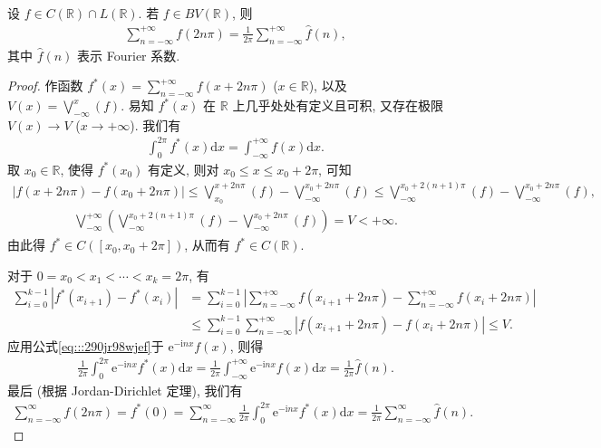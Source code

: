 \documentclass[../../main.tex]{subfiles}%
\begin{document}
\begin{proposition}[Poisson公式]
设 $f\in C(\mathbb{R})\cap L(\mathbb{R})$. 若 $f\in BV(\mathbb{R})$, 则
\begin{align*}
\sum_{n=-\infty}^{+\infty} f(2n\pi) = \frac{1}{2\pi}\sum_{n=-\infty}^{+\infty} \hat{f}(n),
\end{align*}
其中 $\hat{f}(n)$ 表示 Fourier 系数.
\end{proposition}
\begin{proof}

作函数 $f^*(x)=\sum_{n=-\infty}^{+\infty} f(x+2n\pi)$ ($x\in\mathbb{R}$), 以及 $V(x)=\bigvee_{-\infty}^x(f)$. 易知 $f^*(x)$ 在 $\mathbb{R}$ 上几乎处处有定义且可积, 又存在极限 $V(x)\to V$ ($x\to+\infty$). 我们有
\begin{align}\label{eq:::290jr98wjef}
\int_0^{2\pi} f^*(x)\mathrm{d}x = \int_{-\infty}^{+\infty} f(x)\mathrm{d}x.
\end{align}
取 $x_0\in\mathbb{R}$, 使得 $f^*(x_0)$ 有定义, 则对 $x_0\leqslant x\leqslant x_0+2\pi$, 可知
\begin{align*}
|f(x+2n\pi)-f(x_0+2n\pi)| \leqslant \bigvee_{x_0}^{x+2n\pi}(f) - \bigvee_{-\infty}^{x_0+2n\pi}(f) 
\leqslant \bigvee_{-\infty}^{x_0+2(n+1)\pi}(f) - \bigvee_{-\infty}^{x_0+2n\pi}(f), 
\end{align*}
\begin{align*}
\bigvee_{-\infty}^{+\infty}\left(\bigvee_{-\infty}^{x_0+2(n+1)\pi}(f) - \bigvee_{-\infty}^{x_0+2n\pi}(f)\right) = V < +\infty.
\end{align*}
由此得 $f^*\in C([x_0,x_0+2\pi])$, 从而有 $f^*\in C(\mathbb{R})$.

对于 $0=x_0<x_1<\cdots<x_k=2\pi$, 有
\begin{align*}
\sum_{i=0}^{k-1} |f^*(x_{i+1})-f^*(x_i)|
&= \sum_{i=0}^{k-1} \left|\sum_{n=-\infty}^{+\infty} f(x_{i+1}+2n\pi) - \sum_{n=-\infty}^{+\infty} f(x_i+2n\pi)\right| \\
&\leqslant \sum_{i=0}^{k-1} \sum_{n=-\infty}^{+\infty} |f(x_{i+1}+2n\pi)-f(x_i+2n\pi)| \leqslant V.
\end{align*}
应用公式\eqref{eq:::290jr98wjef}于 $\mathrm{e}^{-\mathrm{i}nx}f(x)$, 则得
\begin{align*}
\frac{1}{2\pi}\int_0^{2\pi} \mathrm{e}^{-\mathrm{i}nx}f^*(x)\mathrm{d}x = \frac{1}{2\pi}\int_{-\infty}^{+\infty} \mathrm{e}^{-\mathrm{i}nx}f(x)\mathrm{d}x = \frac{1}{2\pi}\hat{f}(n).
\end{align*}
最后 (根据 Jordan-Dirichlet 定理), 我们有
\begin{align*}
\sum_{n=-\infty}^{\infty} f(2n\pi) = f^*(0) = \sum_{n=-\infty}^{\infty} \frac{1}{2\pi}\int_0^{2\pi} \mathrm{e}^{-\mathrm{i}nx}f^*(x)\mathrm{d}x = \frac{1}{2\pi}\sum_{n=-\infty}^{\infty} \hat{f}(n).
\end{align*}

\end{proof}
\end{document}
